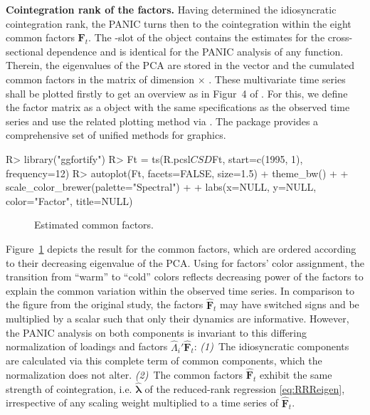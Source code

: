 \textbf{Cointegration rank of the factors.} Having determined the idiosyncratic cointegration rank, the PANIC turns then to the cointegration within the eight common factors $ \boldsymbol{F}_{t} $. The -slot of the  object contains the estimates for the cross-sectional dependence and is identical for the PANIC analysis of any  function. Therein, the eigenvalues of the PCA are stored in the vector  and the cumulated common factors in the matrix  of dimension  $ \times $ . These multivariate time series shall be plotted firstly to get an overview as in Figur~4 of \citet[p.~71]{ArsovaOersal2017}. For this, we define the factor matrix  as a  object with the same specifications as the observed time series and use the related plotting method via . The package  \citep{TangEtAl2016} provides a comprehensive set of unified methods for  graphics.
\begin{CodeChunk}
\begin{CodeInput}
R> library("ggfortify")
R> Ft = ts(R.pcsl$CSD$Ft, start=c(1995, 1), frequency=12)
R> autoplot(Ft, facets=FALSE, size=1.5) + theme_bw() + 
+     scale_color_brewer(palette="Spectral") +
+     labs(x=NULL, y=NULL, color="Factor", title=NULL)
\end{CodeInput}
\end{CodeChunk}
\begin{figure}[ht] %
	\centering
	\caption{Estimated common factors.}
	\resizebox{0.8\textwidth}{!}{
		}
	\label{fig:Factors}
\end{figure}
Figure~\ref{fig:Factors} depicts the  result for the common factors, which are ordered according to their decreasing eigenvalue of the PCA. Using  for factors' color assignment, the transition from ``warm'' to ``cold'' colors reflects decreasing power of  the factors to explain the common variation within the observed time series. In comparison to the figure from the original study, the factors $ \boldsymbol{\hat{F}}_t $ may have switched signs and be multiplied by a scalar such that only their dynamics are informative. However, the PANIC analysis on both components is invariant to this differing normalization of loadings and factors $ \hat{\Lambda}_i' \boldsymbol{\hat{F}}_t $: \textit{(1)}~The idiosyncratic components are calculated via this complete term of common components, which the normalization does not alter. \textit{(2)}~The common factors $ \boldsymbol{\hat{F}}_{t} $ exhibit the same strength of cointegration, i.e. $ \boldsymbol{\hat{\lambda}} $ of the reduced-rank regression \eqref{eq:RRReigen}, irrespective of any scaling weight multiplied to a time series of $ \boldsymbol{\hat{F}}_{t} $.

